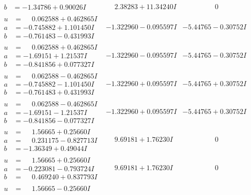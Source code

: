\documentclass[1p]{elsarticle_modified}
\theoremstyle{definition}
\begin{document}
$$\begin{array}{c|c|c}
\begin{aligned}
b &= -1.34786 + 0.90026 I\end{aligned}
 & \phantom{-}2.38283 + 11.34240 I & \phantom{-0.000000 } 0 \\ \hline\begin{aligned}
u &= \phantom{-}0.062588 + 0.462865 I \\
a &= -0.745882 + 1.101450 I \\
b &= -0.761483 - 0.431993 I\end{aligned}
 & -1.322960 - 0.095597 I & -5.44765 - 0.30752 I \\ \hline\begin{aligned}
u &= \phantom{-}0.062588 + 0.462865 I \\
a &= -1.69151 + 1.21537 I \\
b &= -0.841856 + 0.077327 I\end{aligned}
 & -1.322960 - 0.095597 I & -5.44765 - 0.30752 I \\ \hline\begin{aligned}
u &= \phantom{-}0.062588 - 0.462865 I \\
a &= -0.745882 - 1.101450 I \\
b &= -0.761483 + 0.431993 I\end{aligned}
 & -1.322960 + 0.095597 I & -5.44765 + 0.30752 I \\ \hline\begin{aligned}
u &= \phantom{-}0.062588 - 0.462865 I \\
a &= -1.69151 - 1.21537 I \\
b &= -0.841856 - 0.077327 I\end{aligned}
 & -1.322960 + 0.095597 I & -5.44765 + 0.30752 I \\ \hline\begin{aligned}
u &= \phantom{-}1.56665 + 0.25660 I \\
a &= \phantom{-}0.231175 - 0.827713 I \\
b &= -1.36349 + 0.49044 I\end{aligned}
 & \phantom{-}9.69181 + 1.76230 I & \phantom{-0.000000 } 0 \\ \hline\begin{aligned}
u &= \phantom{-}1.56665 + 0.25660 I \\
a &= -0.223081 - 0.793724 I \\
b &= \phantom{-}0.469240 + 0.837793 I\end{aligned}
 & \phantom{-}9.69181 + 1.76230 I & \phantom{-0.000000 } 0 \\ \hline\begin{aligned}
u &= \phantom{-}1.56665 - 0.25660 I \\

\end{aligned}
\end{array}$$
\end{document}
